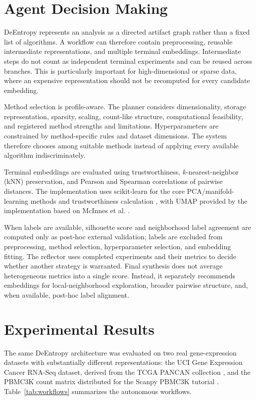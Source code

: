 \documentclass[10pt]{article}
\begin{document}
\section{Agent Decision Making}

DeEntropy represents an analysis as a directed artifact graph rather than a
fixed list of algorithms. A workflow can therefore contain preprocessing,
reusable intermediate representations, and multiple terminal embeddings.
Intermediate steps do not count as independent terminal experiments and can be
reused across branches. This is particularly important for high-dimensional
or sparse data, where an expensive representation should not be recomputed for
every candidate embedding.

Method selection is profile-aware. The planner considers dimensionality,
storage representation, sparsity, scaling, count-like structure,
computational feasibility, and registered method strengths and limitations.
Hyperparameters are constrained by method-specific rules and dataset
dimensions. The system therefore chooses among suitable methods instead of
applying every available algorithm indiscriminately.

Terminal embeddings are evaluated using trustworthiness,
$k$-nearest-neighbor (kNN) preservation, and Pearson and Spearman correlations
of pairwise distances. The implementation uses scikit-learn for the core
PCA/manifold-learning methods and trustworthiness calculation
\cite{pedregosa2011,sklearn_manifold}, with UMAP provided by the implementation
based on McInnes et al. \cite{mcinnes2018}.

When labels are available, silhouette score and neighborhood label agreement
are computed only as post-hoc external validation; labels are excluded
from preprocessing, method selection, hyperparameter selection, and embedding
fitting. The reflector uses completed experiments and their metrics to decide
whether another strategy is warranted. Final synthesis does not average
heterogeneous metrics into a single score. Instead, it separately recommends
embeddings for local-neighborhood exploration, broader pairwise structure, and,
when available, post-hoc label alignment.

\section{Experimental Results}

The same DeEntropy architecture was evaluated on two real gene-expression
datasets with substantially different representations: the UCI Gene Expression
Cancer RNA-Seq dataset, derived from the TCGA PANCAN collection
\cite{uci_tcga}, and the PBMC3K count matrix distributed for the Scanpy PBMC3K
tutorial \cite{zenodo_pbmc,tenx_pbmc}. Table~\ref{tab:workflows} summarizes the
autonomous workflows.
\end{document}
